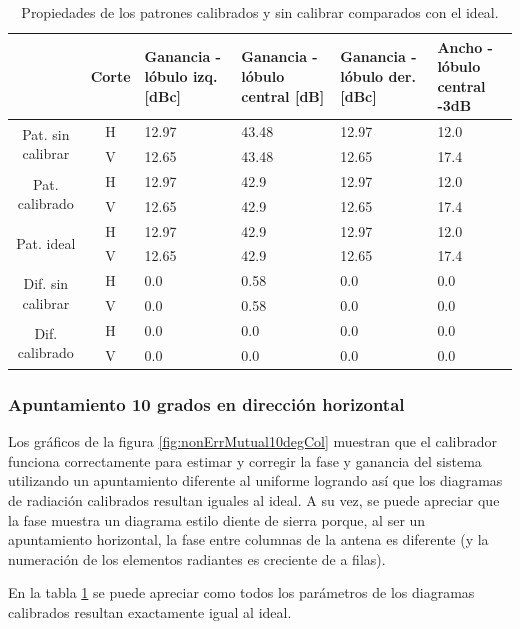 \begin{table}[H]
  \footnotesize
  \centering
  \begin{tabular}{|c|c|p{2cm}|p{2.5cm}|p{2.5cm}|p{2.5cm}|}
    \cline{2-6}
    \multicolumn{1}{c|}{} & Corte & Ganancia - lóbulo izq. [dBc] & Ganancia - lóbulo central [dB] &
    Ganancia - lóbulo der. [dBc] & Ancho - lóbulo central -3dB \tabularnewline\hline
    \multirow{2}{2cm}{Pat. sin calibrar} & H & 12.97 & 43.48 & 12.97 & 12.0 \tabularnewline\cline{2-6}
     & V & 12.65 & 43.48 & 12.65 & 17.4 \tabularnewline\hline
    \multirow{2}{2cm}{Pat. calibrado} & H & 12.97 & 42.9 & 12.97 & 12.0 \tabularnewline\cline{2-6}
     & V & 12.65 & 42.9 & 12.65 & 17.4 \tabularnewline\hline
    \multirow{2}{2cm}{Pat. ideal} & H & 12.97 & 42.9 & 12.97 & 12.0 \tabularnewline\cline{2-6}
     & V & 12.65 & 42.9 & 12.65 & 17.4 \tabularnewline\hline
    \multirow{2}{2cm}{Dif. sin calibrar} & H & 0.0 & 0.58 & 0.0 & 0.0\tabularnewline\cline{2-6}
     & V & 0.0 & 0.58 & 0.0 & 0.0 \tabularnewline\hline
    \multirow{2}{2cm}{Dif. calibrado} & H & 0.0 & 0.0 & 0.0 & 0.0 \tabularnewline\cline{2-6}
     & V & 0.0 & 0.0 & 0.0 & 0.0 \tabularnewline\hline
  \end{tabular}
  \caption{Propiedades de los patrones calibrados y sin calibrar comparados con el ideal.}
  \label{tab:nonErrMutual0deg}
\end{table}


\subsubsection{Apuntamiento 10 grados en dirección horizontal}

Los gráficos de la figura \ref{fig:nonErrMutual10degCol} muestran que el calibrador funciona correctamente para estimar y 
corregir la fase y ganancia del sistema utilizando un apuntamiento diferente al uniforme logrando así que los diagramas de 
radiación calibrados resultan iguales al ideal. A su vez, se puede apreciar que la fase muestra un diagrama estilo diente 
de sierra porque, al ser un apuntamiento horizontal, la fase entre columnas de la antena es diferente (y la numeración de 
los elementos radiantes es creciente de a filas).

En la tabla \ref{tab:nonErrMutual0deg} se puede apreciar como todos los parámetros de los diagramas calibrados resultan 
exactamente igual al ideal.

